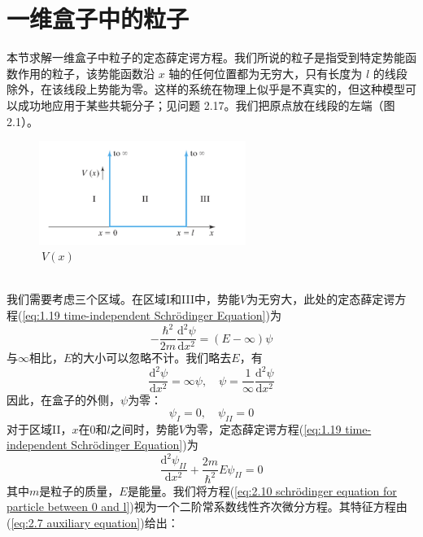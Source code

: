 \section{一维盒子中的粒子}
	本节求解一维盒子中粒子的定态薛定谔方程。我们所说的粒子是指受到特定势能函数作用的粒子，该势能函数沿 $x$ 轴的任何位置都为无穷大，只有长度为 $l$ 的线段除外，在该线段上势能为零。这样的系统在物理上似乎是不真实的，但这种模型可以成功地应用于某些共轭分子；见问题 2.17。我们把原点放在线段的左端（图 2.1）。
	\begin{figure}[h!]
		\centering
		\includegraphics[width=0.6\textwidth]{Figures/2.1.png}  %
		\caption{$\: V\left(x\right)$}
		\label{fig:2.1}
	\end{figure}
	\\
	\indent 我们需要考虑三个区域。在区域I和III中，势能$V$为无穷大，此处的定态薛定谔方程(\ref{eq:1.19 time-independent Schrödinger Equation})为
	\begin{equation*}
		-\frac{\hbar^2}{2m}\frac{\mathrm{d}^2\psi}{\mathrm{d}x^2} = \left(E - \infty\right)\psi
	\end{equation*}
	与$\infty$相比，$E$的大小可以忽略不计。我们略去$E$，有
	\begin{equation*}
		\frac{\mathrm{d}^2\psi}{\mathrm{d}x^2} = \infty \psi, \quad \psi = \frac{1}{\infty}\frac{\mathrm{d}^2\psi}{\mathrm{d}x^2}
	\end{equation*}
	因此，在盒子的外侧，$\psi$为零：
	\begin{equation}
		\psi_I=0, \quad \psi_{II} = 0
		\label{eq:2.9 psi outside the box}
	\end{equation}
	\indent 对于区域II，$x$在0和$l$之间时，势能$V$为零，定态薛定谔方程(\ref{eq:1.19 time-independent Schrödinger Equation})为
	\begin{equation}
		\frac{\mathrm{d}^2\psi_{II}}{\mathrm{d}x^2}+\frac{2m}{\hbar^2}E\psi_{II}=0
		\label{eq:2.10 schrödinger equation for particle between 0 and l}
	\end{equation}
	其中$m$是粒子的质量，$E$是能量。我们将方程(\ref{eq:2.10 schrödinger equation for particle between 0 and l})视为一个二阶常系数线性齐次微分方程。其特征方程由(\ref{eq:2.7 auxiliary equation})给出：
